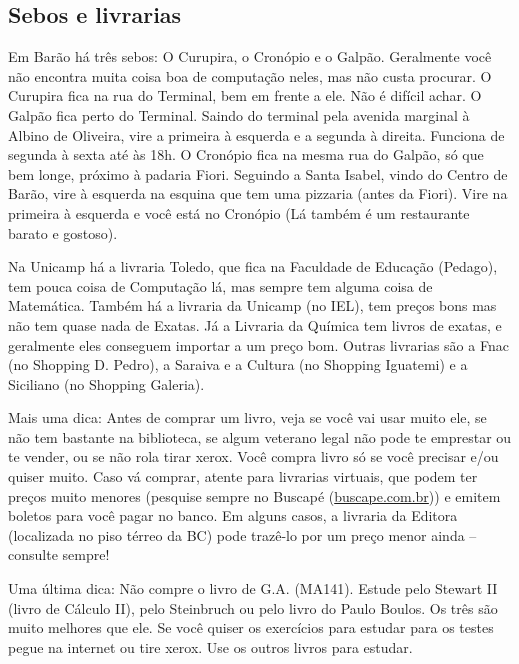 \subsection{Sebos e livrarias}

Em Barão há três sebos: O Curupira, o Cronópio e o Galpão. Geralmente você não
encontra muita coisa boa de computação neles, mas não custa procurar. O Curupira
fica na rua do Terminal, bem em frente a ele. Não é difícil achar. O Galpão fica
perto do Terminal. Saindo do terminal pela avenida marginal à Albino de
Oliveira, vire a primeira à esquerda e a segunda à direita. Funciona de segunda
à sexta até às 18h. O Cronópio fica na mesma rua do Galpão, só que bem longe,
próximo à padaria Fiori. Seguindo a Santa Isabel, vindo do Centro de Barão, vire
à esquerda na esquina que tem uma pizzaria (antes da Fiori). Vire na primeira à
esquerda e você está no Cronópio (Lá também é um restaurante barato e gostoso).

Na Unicamp há a livraria Toledo, que fica na Faculdade de Educação (Pedago), tem
pouca coisa de Computação lá, mas sempre tem alguma coisa de Matemática. Também
há a livraria da Unicamp (no IEL), tem preços bons mas não tem quase nada de
Exatas. Já a Livraria da Química tem livros de exatas, e geralmente eles
conseguem importar a um preço bom. Outras livrarias são a Fnac (no Shopping D.
Pedro), a Saraiva e a Cultura (no Shopping Iguatemi) e a Siciliano (no Shopping
Galeria).

Mais uma dica: Antes de comprar um livro, veja se você vai usar muito ele, se
não tem bastante na biblioteca, se algum veterano legal não pode te emprestar ou
te vender, ou se não rola tirar xerox. Você compra livro só se você precisar
e/ou quiser muito. Caso vá comprar, atente para livrarias virtuais, que podem
ter preços muito menores (pesquise sempre no Buscapé (\url{buscape.com.br})) e
emitem boletos para você pagar no banco.  Em alguns casos, a livraria da Editora
(localizada no piso térreo da BC) pode trazê-lo por um preço menor ainda --
consulte sempre!

Uma última dica: Não compre o livro de G.A. (MA141). Estude pelo Stewart II
(livro de Cálculo II), pelo Steinbruch ou pelo livro do Paulo Boulos. Os três
são muito melhores que ele. Se você quiser os exercícios para estudar para os
testes pegue na internet ou tire xerox. Use os outros livros para estudar.

